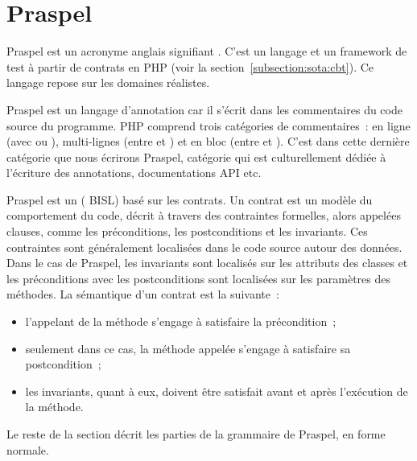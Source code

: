 \def\gsep{$\quad::=\quad$}
\def\mvert{$\;\;|\;\;$}
\newcommand{\gtoken}[1]{\underline{\code{php-#1}}}
\newcommand{\grule}[1]{\textit{#1}}

\section{Praspel}
\label{section:language:praspel}

Praspel est un acronyme anglais signifiant . C'est un langage et un framework de test à partir
de contrats en PHP (voir la section~\ref{subsection:sota:cbt}). Ce langage
repose sur les domaines réalistes.

Praspel est un {\strong langage d'annotation} car il s'écrit dans les
commentaires du code source du programme. PHP comprend trois catégories de
commentaires~: en ligne (avec \code{//} ou \code{\#}), multi-lignes (entre
\code{/*} et \code{*/}) et en bloc (entre \code{/**} et \code{*/}). C'est dans
cette dernière catégorie que nous écrirons Praspel, catégorie qui est
culturellement dédiée à l'écriture des annotations, documentations API etc.

Praspel est un  ({\strong
BISL}) basé sur les contrats. Un {\strong contrat} est un modèle du comportement
du code, décrit à travers des contraintes formelles, alors appelées {\strong
clauses}, comme les préconditions, les postconditions et les invariants. Ces
contraintes sont généralement localisées dans le code source autour des données.
Dans le cas de Praspel, les invariants sont localisés sur les attributs des
classes et les préconditions avec les postconditions sont localisées sur les
paramètres des méthodes. La sémantique d'un contrat est la suivante~:

\begin{itemize}

\item l'appelant de la méthode s'engage à satisfaire la précondition~;

\item seulement dans ce cas, la méthode appelée s'engage à satisfaire sa
postcondition~;

\item les invariants, quant à eux, doivent être satisfait avant et après
l'exécution de la méthode.

\end{itemize}

Le reste de la section décrit les parties de la grammaire de Praspel, en forme
normale.

